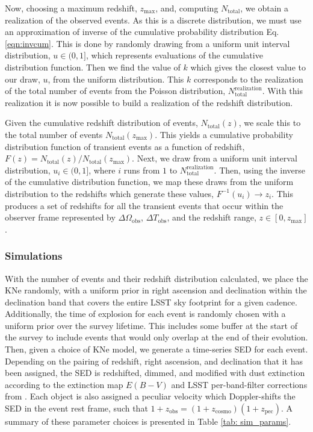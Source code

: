Now, choosing a maximum redshift, $z_{\mathrm{max}}$, and, computing $N_{\mathrm{ total}}$, we obtain a realization of the observed events. As this is a discrete distribution, we must use an approximation of inverse of the cumulative probability distribution Eq. \ref{eqn:invcum}. This is done by randomly drawing from a uniform unit interval distribution, $u\in(0,1]$, which represents evaluations of the cumulative distribution function. Then we find the value of $k$ which gives the closest value to our draw, $u$, from the uniform distribution. This $k$ corresponds to the realization of the total number of events from the Poisson distribution, $N_{\mathrm{ total}}^{\mathrm{realization}}$. With this realization it is now possible to build a realization of the redshift distribution.

Given the cumulative redshift distribution of events, $N_{\mathrm{total}}(z)$, we scale this to the total number of events $N_{\mathrm{total}}(z_{\mathrm{max}})$. This yields a cumulative probability distribution function of transient events as a function of redshift, $F(z) = N_{\mathrm{total}}(z)/ N_{\mathrm{total}}(z_{\mathrm{max}})$. Next, we draw from a uniform unit interval distribution, $u_i\in(0,1]$, where $i$ runs from $1$ to $N_{\mathrm{ total}}^{\mathrm{realization}}$. Then, using the inverse of the cumulative distribution function, we map these draws from the uniform distribution to the redshifts which generate these values, $F^{-1}(u_i) \rightarrow z_i$. This produces a set of redshifts for all the transient events that occur within the observer frame represented by $\Delta \Omega_{\mathrm{obs}}$, $\Delta T_{\mathrm{obs}}$, and the redshift range, $z \in [0,z_{\mathrm{max}}]$.

\subsubsection{Simulations}
With the number of events and their redshift distribution calculated, we place the KNe randomly, with a uniform prior in right ascension and declination within the declination band that covers the entire LSST sky footprint for a given cadence. Additionally, the time of explosion for each event is randomly chosen with a uniform prior over the survey lifetime. This includes some buffer at the start of the survey to include events that would only overlap at the end of their evolution. Then, given a choice of KNe model, we generate a time-series SED for each event. Depending on the pairing of redshift, right ascension, and declination that it has been assigned, the SED is redshifted, dimmed, and modified with dust extinction according to the extinction map $E(B-V)$ and LSST per-band-filter corrections from
\citet{Schlafly2011}. Each object is also assigned a peculiar velocity which Doppler-shifts the SED in the event rest frame, such that $1 + z_{\mathrm{obs}} = (1+z_{\mathrm{cosmo}})(1+z_{\mathrm{pec}})$. A summary of these parameter choices is presented in Table \ref{tab: sim_params}.

